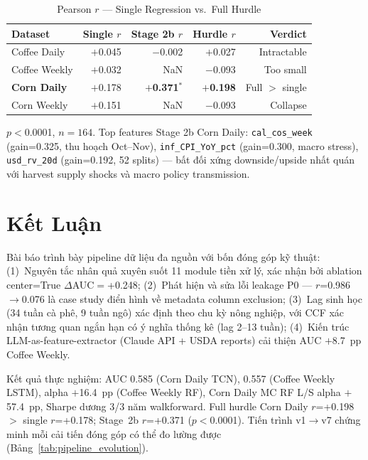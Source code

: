 \documentclass[conference]{IEEEtran}
\begin{document}
\begin{table}[H]
\caption{Pearson $r$ — Single Regression vs.\ Full Hurdle}
\label{tab:hurdle}
\centering
\begin{threeparttable}
\begin{tabular}{@{}lrrrr@{}}
\toprule
\textbf{Dataset} & \textbf{Single $r$} & \textbf{Stage 2b $r$} & \textbf{Hurdle $r$} & \textbf{Verdict} \\
\midrule
Coffee Daily  & $+$0.045 & $-$0.002 & $+$0.027 & Intractable \\
Coffee Weekly & $+$0.032 & NaN & $-$0.093 & Too small \\
\textbf{Corn Daily} & $+$0.178 & $+$\textbf{0.371}$^*$ & $+$\textbf{0.198} & Full $>$ single \\
Corn Weekly   & $+$0.151 & NaN & $-$0.093 & Collapse \\
\bottomrule
\end{tabular}
\begin{tablenotes}
\footnotesize
\item[*] $p<$0.0001, $n=164$. Top features Stage 2b Corn Daily:
\texttt{cal\_cos\_week} (gain=0.325, thu hoạch Oct--Nov),
\texttt{inf\_CPI\_YoY\_pct} (gain=0.300, macro stress),
\texttt{usd\_rv\_20d} (gain=0.192, 52 splits) —
bất đối xứng downside/upside nhất quán với harvest supply shocks
và macro policy transmission.
\end{tablenotes}
\end{threeparttable}
\end{table}

\section{Kết Luận}

Bài báo trình bày pipeline dữ liệu đa nguồn với bốn đóng góp kỹ thuật:
(1)~Nguyên tắc nhân quả xuyên suốt 11 module tiền xử lý, xác nhận bởi
ablation center=True $\Delta$AUC$=$+0.248; (2)~Phát hiện và sửa lỗi
leakage P0 — $r$=0.986$\to$0.076 là case study điển hình về metadata column
exclusion; (3)~Lag sinh học (34 tuần cà phê, 9 tuần ngô) xác định theo chu kỳ nông
nghiệp, với CCF xác nhận tương quan ngắn hạn có ý nghĩa thống kê (lag
2--13 tuần); (4)~Kiến trúc LLM-as-feature-extractor (Claude API +
USDA reports) cải thiện AUC $+$8.7~pp Coffee Weekly.

Kết quả thực nghiệm: AUC 0.585 (Corn Daily TCN), 0.557 (Coffee Weekly LSTM),
alpha $+$16.4~pp (Coffee Weekly RF), Corn Daily MC RF L/S alpha $+$57.4~pp,
Sharpe dương 3/3 năm walkforward. Full hurdle Corn Daily $r$=+0.198 $>$ single $r$=+0.178;
Stage~2b $r$=+0.371 ($p<$0.0001). Tiến trình v1$\to$v7 chứng minh mỗi
cải tiến đóng góp có thể đo lường được (Bảng~\ref{tab:pipeline_evolution}).
\end{document}
